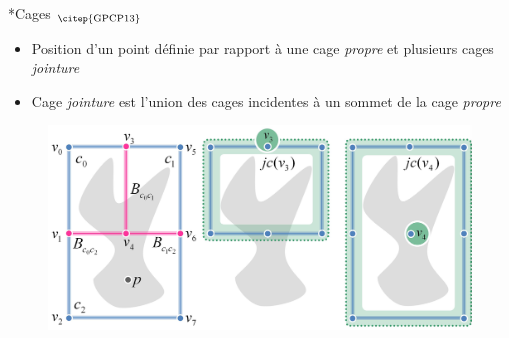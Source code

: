 \documentclass[xcolor=x11names,compress]{beamer}
\renewcommand{\(}{\begin{columns}} \renewcommand{\)}{\end{columns}}
\newcommand{\<}[1]{\begin{column}{#1}} \renewcommand{\>}{\end{column}}
\begin{document}
\begin{frame}{*Cages $_{\text{\citep{GPCP13}}}$}
  \begin{itemize}
  \item Position d'un point définie par rapport à une cage
    \textit{propre} et plusieurs cages \textit{jointure}
  \item Cage \textit{jointure} est l'union des cages incidentes à un
    sommet de la cage \textit{propre}
  \end{itemize}
  \begin{figure}[h]
    \begin{center}
      \includegraphics[scale=0.07]{joinCages}
    \end{center}
    \caption{\citep{GPCP13}}
  \end{figure}
\end{frame}

\end{document}
